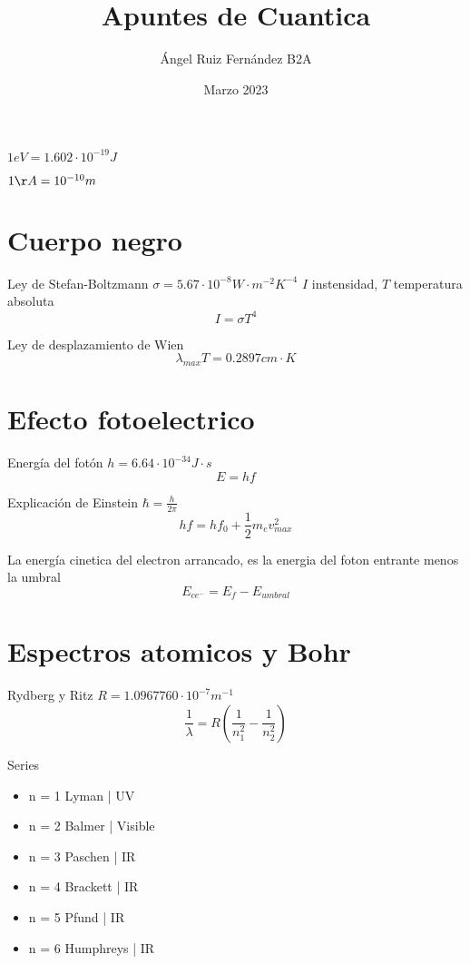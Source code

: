 \documentclass[12pt, letterpaper, twoside]{article}
\title{Apuntes de Cuantica}
\author{Ángel Ruiz Fernández B2A}
\date{Marzo 2023}
\begin{document}
	\maketitle
	
	$1eV = 1.602 \cdot 10^{-19} J$
	
	$1 \AA = 10^{-10}m$
	
	\section{Cuerpo negro}
	
	Ley de Stefan-Boltzmann $\sigma = 5.67 \cdot 10^{-8} W \cdot m^{-2} K^{-4} $ $I$ instensidad, $T$ temperatura absoluta
	\begin{equation}
		I = \sigma T^4
	\end{equation}
	
	Ley de desplazamiento de Wien	
	\begin{equation}
		\lambda_{max} T = 0.2897 cm \cdot K
	\end{equation}

	\section{Efecto fotoelectrico}
	
	Energía del fotón $h = 6.64 \cdot 10^{-34} J \cdot s$
	\begin{equation}
		E = hf
	\end{equation}

	Explicación de Einstein $\hbar = \frac{h}{2 \pi}$
	\begin{equation}
		hf = hf_0 + \frac{1}{2} m_e v^2_{max}
	\end{equation}

	La energía cinetica del electron arrancado, es la energia del foton entrante menos la umbral
	\begin{equation}
		E_{ce^-} = E_f - E_{umbral}
	\end{equation}

	\section{Espectros atomicos y Bohr}
	Rydberg y Ritz $R = 1.0967760 \cdot 10^{-7} m^{-1}$
	\begin{equation}
		\frac{1}{\lambda} = R ( \frac{1}{n_{1}^2} - \frac{1}{n^{2}_2})
	\end{equation}

	\pagebreak
	Series
	\begin{itemize}
		\item n = 1 Lyman | UV
		\item n = 2 Balmer | Visible
		\item n = 3 Paschen | IR
		\item n = 4 Brackett | IR
		\item n = 5 Pfund | IR
		\item n = 6 Humphreys | IR
	\end{itemize}
\end{document}
